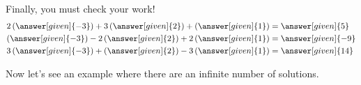\documentclass{ximera}
\begin{document}
\begin{example}
\begin{explanation}
Finally, you must check your work!
  \begin{align*}
    2\left(\answer[given]{-3}\right)+ 3\left(\answer[given]{2}\right) + \left(\answer[given]{1}\right)  &= \answer[given]{5} \\
    \left(\answer[given]{-3}\right) -2\left(\answer[given]{2}\right)+ 2\left(\answer[given]{1}\right) &=\answer[given]{-9}\\
    3\left(\answer[given]{-3}\right) +\left(\answer[given]{2}\right)- 3\left(\answer[given]{1}\right) &=\answer[given]{14}
  \end{align*}
\end{explanation}
\end{example}

Now let's see an example where there are an infinite number of solutions.
\end{document}
